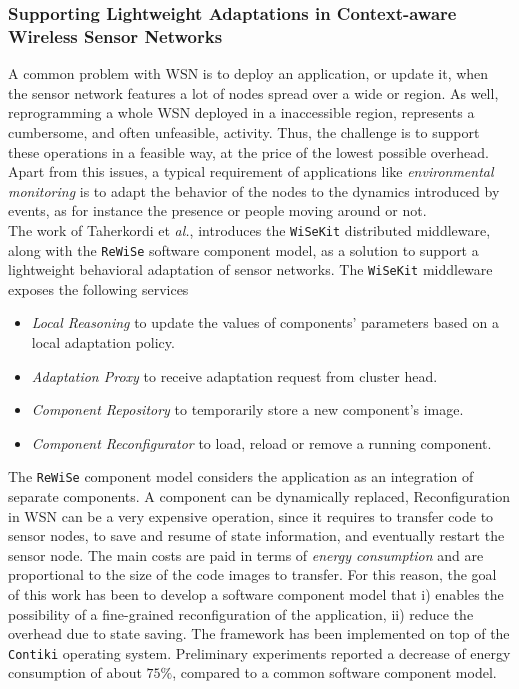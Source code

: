 \subsubsection*{Supporting Lightweight Adaptations in Context-aware
Wireless Sensor Networks}

A common problem with WSN is to deploy an application, or update it, when the
sensor network features a lot of nodes spread over a wide or region. As well,
reprogramming a whole WSN deployed in a inaccessible region, represents a
cumbersome, and often unfeasible, activity. Thus, the challenge is to support
these operations in a feasible way, at the price of the lowest possible
overhead.
\\
Apart from this issues, a typical requirement of applications like
\emph{environmental monitoring} is to adapt the behavior of the nodes to the
dynamics introduced by events, as for instance the presence or people moving
around or not. 
\\
The work of Taherkordi et \emph{al.}\cite{app:taherkordi}, introduces the
\texttt{WiSeKit} distributed middleware, along with the \texttt{ReWiSe} software
component model, as a solution to support a lightweight behavioral adaptation of
sensor networks. The \texttt{WiSeKit} middleware exposes the following services
\begin{itemize}
	\item \emph{Local Reasoning} to update the values of components’ parameters
		based on a local adaptation policy.
	\item \emph{Adaptation Proxy} to receive adaptation request from cluster
		head.
	\item \emph{Component Repository} to temporarily store a new component’s
		image.
	\item \emph{Component Reconfigurator} to load, reload or remove a running
		component.
\end{itemize}
The \texttt{ReWiSe} component model considers the application as an integration
of separate components. A component can be dynamically replaced, Reconfiguration
in  WSN can be a very expensive operation, since it requires to transfer code to
sensor nodes, to save and resume of state information, and eventually restart
the sensor node. The main costs are paid in terms of \emph{energy consumption}
and are proportional to the size of the code images to transfer. For this
reason, the goal of this work has been to develop a software component model
that i) enables the possibility of a fine-grained reconfiguration of the
application, ii) reduce the overhead due to state saving.
The framework has been implemented on top of the \texttt{Contiki} operating
system. Preliminary experiments reported a decrease of energy consumption of
about $75\%$, compared to a common software component model.

